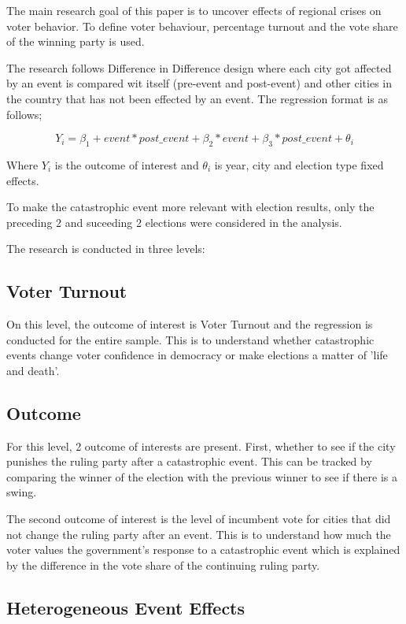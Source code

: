 \documentclass[12pt]{article}
\begin{document}
The main research goal of this paper is to uncover effects of regional crises on voter behavior. To define voter behaviour, percentage turnout and the vote share of the winning party is used. 

The research follows Difference in Difference design where each city got affected by an event is compared wit itself (pre-event and post-event) and other cities in the country that has not been effected by an event. The regression format is as follows;

$$ Y_i = \beta_{1} + {event * post\_event} + \beta_{2} * {event} + \beta_{3} * {post\_event} + \theta_i$$

Where $Y_i$ is the outcome of interest and $\theta_i$ is year, city and election type fixed effects.

To make the catastrophic event more relevant with election results, only the preceding 2 and suceeding 2 elections were considered in the analysis.

The research is conducted in three levels:

\subsection{Voter Turnout}

On this level, the outcome of interest is Voter Turnout and the regression is conducted for the entire sample. This is to understand whether catastrophic events change voter confidence in democracy or make elections a matter of 'life and death'.

\subsection{Outcome}

For this level, 2 outcome of interests are present. First, whether to see if the city punishes the ruling party after a catastrophic event. This can be tracked by comparing the winner of the election with the previous winner to see if there is a swing.

The second outcome of interest is the level of incumbent vote for cities that did not change the ruling party after an event. This is to understand how much the voter values the government's response to a catastrophic event which is explained by the difference in the vote share of the continuing ruling party.

\subsection{Heterogeneous Event Effects}
\end{document}

